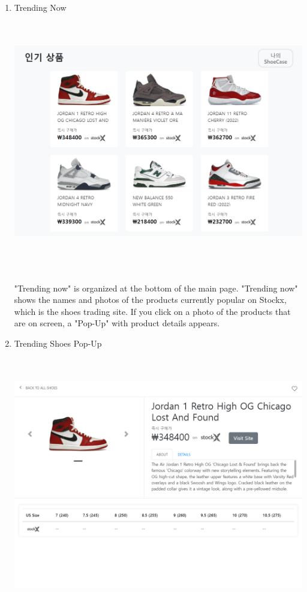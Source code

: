 \documentclass[conference]{IEEEtran}
\begin{document}
\begin{enumerate}
	\item Trending Now \\\\
\\\centerline{\includegraphics[scale=0.3]{pics/trending.png}}\\
\\\\ "Trending now" is organized at the bottom of the main page. "Trending now" shows the names and photos of the products currently popular on Stockx, which is the shoes trading site. If you click on a photo of the products that are on screen, a "Pop-Up" with product details appears.\\
	\item Trending Shoes Pop-Up\\\\
\\\centerline{\includegraphics[scale=0.35]{pics/trending_detail.png}}

\end{enumerate}
\end{document}
